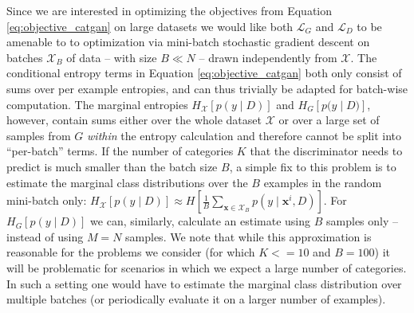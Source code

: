 \documentclass{article} \usepackage{iclr2016_conference,times}
\newcommand{\bx}{\mathbf{x}}
\newcommand{\cLD}{\mathcal{L}_D}
\newcommand{\cLG}{\mathcal{L}_G}
\begin{document}
Since we are interested in optimizing the objectives from Equation
\eqref{eq:objective_catgan} on large datasets we would like both
$\cLG$ and $\cLD$ to be amenable to to optimization via mini-batch
stochastic gradient descent on batches $\mathcal{X}_B$ of data -- with
size $B \ll N$ -- drawn independently from $\mathcal{X}$. The conditional entropy terms in
Equation \eqref{eq:objective_catgan} both only consist of sums over
per example entropies, and can thus trivially be adapted for batch-wise
computation. The marginal entropies $H_{\mathcal{X}} [ p( y \mid
D ) ]$ and $H_{G} [ p\big( y \mid D \big) ]$, however,
contain sums either over the whole dataset $\mathcal{X}$ or over a
large set of samples from $G$ \emph{within} the entropy
calculation and therefore cannot be split into ``per-batch'' terms. 
If the number of categories $K$ that the discriminator needs
to predict is much smaller than the batch size $B$, a simple fix to
this problem is to estimate the marginal class distributions over the
$B$ examples in the random mini-batch only: $H_\mathcal{X} [ p(y \mid
D) ] \approx H [ \frac{1}{B} \sum_{\bx \in \mathcal{X}_B} p(y \mid
\bx^i, D) ]$.
For $H_{G} [ p( y \mid D ) ]$ we can, similarly, calculate an estimate
using $B$ samples only -- instead of using $M = N$ samples. We note
that while this approximation is reasonable for the problems we
consider (for which $K <= 10$ and $B = 100$) it will be problematic for scenarios in
which we expect a large number of categories. In such a setting one
would have to estimate the marginal class distribution over multiple batches
(or periodically evaluate it on a larger number of examples).
\end{document}
